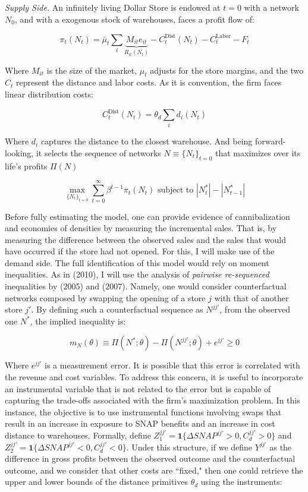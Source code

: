 \documentclass[11pt]{article}
\newcounter{fox}
\begin{document}
\textit{Supply Side.}  An infinitely living {Dollar Store} is endowed at $t=0$ with a network $N_0$, and with a exogenous stock of warehouses, faces a profit flow of:

       \[\pi_t(N_t)  =\bar \mu_t\sum_{i}   \underbrace{M_{it} e_{it}}_{R_{it}(N_t)} - C_t^\text{Dist}(N_t) - C_t^\text{Labor} - F_t \]

       Where $M_{it}$ is the size of the market, $\mu_t$ adjusts for the store margins, and the two $C_t$ represent the distance and labor costs. As it is convention, the firm faces linear distribution costs:

       \[C_t^{\text{Dist}}(N_t) = \theta_d \sum_{i}  d_{i}(N_t) \]
     
       Where $d_{i}$ captures the distance to the closest warehouse. And being forward-looking, it selects the sequence of networks $N\equiv \{N_t\}_{t=0}$ that maximizes over its life's profits $\Pi(N)$
       
       \[\max_{\{N_t\}_{t=0}}\sum_{t=0}^\infty \beta^{t-1} \pi_t(N_t) \text{ subject to }  |N_t^*|-|N_{t-1}^*|\]     

     Before fully estimating the model, one can provide evidence of cannibalization and economies of densities by measuring the incremental sales. That is, by measuring the difference between the observed sales and the sales that would have occurred if the store had not opened. For this, I will make use of the demand side. The full identification of this model would rely on moment inequalities. As in \citeauthor{holmes2011diffusion} (2010), I will use the analysis of \textit{pairwise re-sequenced} inequalities by \citeauthor{bajari2005measuring} (2005) and \citeauthor{fox2007semiparametric} (2007). Namely, one would consider counterfactual networks composed by swapping the opening of a store $j$ with that of another store $j'$. By defining such a counterfactual sequence as $N^{jj'}$, from the observed one $N^*$, the implied inequality is:

\[
m_N(\theta) \equiv \Pi(N^*; \theta) - \Pi(N^{jj'}; \theta) + \epsilon^{jj'} \geq 0
\]


   Where $\epsilon^{jj'}$ is a measurement error. It is possible that this error is correlated with the revenue and cost variables. To address this concern, it is useful to incorporate an instrumental variable that is not related to the error but is capable of capturing the trade-offs associated with the firm's maximization problem. In this instance, the objective is to use instrumental functions involving swaps that result in an increase in exposure to SNAP benefits and an increase in cost distance to warehouses. Formally, define $Z^{jj'}_1 = \mathbf{1}\{\Delta SNAP^{jj'} > 0, C_d^{jj'} > 0\}$ and $Z^{jj'}_2 = \mathbf{1}\{\Delta SNAP^{jj'} < 0, C_d^{jj'} < 0\}$. Under this structure, if we define $Y^{jj'}$ as the difference in gross profits between the observed outcome and the counterfactual outcome, and we consider that other costs are ``fixed," then one could retrieve the upper and lower bounds of the distance primitives $\theta_d$ using the instruments:
\end{document}
